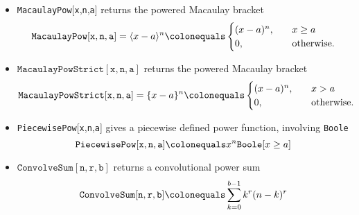 \documentclass[12pt, letterpaper]{amsart}
\newenvironment{myitemize}
{ \begin{itemize}
    \setlength{\itemsep}{4pt}
    \setlength{\parskip}{4pt}
    \setlength{\parsep}{4pt}     }
{ \end{itemize}                  }
\newcommand \power [2]{\langle #1 \rangle^{#2}}
\newcommand \curvepower [2]{\{ #1 \}^{#2}}
\newcommand \MacaulayPow [4][MacaulayPow]{\texttt{#1}[{\texttt{#2}},{\texttt{#3}},{\texttt{#4}}]}
\newcommand \MacaulayPowStrict [4][MacaulayPowStrict]{\texttt{#1}[{\texttt{#2}},{\texttt{#3}},{\texttt{#4}}]}
\newcommand \PiecewisePow [4][PiecewisePow]{\texttt{#1}[{\texttt{#2}},{\texttt{#3}},{\texttt{#4}}]}
\newcommand \ConvolveSum [4][ConvolveSum]{\texttt{{#1}} [{\texttt{#2}},{\texttt{#3}},{\texttt{#4}}]}
\theoremstyle{definition}
\theoremstyle{remark}
\numberwithin{equation}{section}
\begin{document}
\begin{myitemize}
\item \MacaulayPow{x}{n}{a} returns the powered Macaulay bracket
\begin{equation*}
\MacaulayPow{x}{n}{a}=\power{x-a}{n} \colonequals
\begin{cases}
(x-a)^n, &\quad x\geq a \\
0, &\quad \mathrm{otherwise}.
\end{cases}
\end{equation*}
\item $\MacaulayPowStrict{x}{n}{a}$ returns the powered Macaulay bracket
\begin{equation*}
\MacaulayPowStrict{x}{n}{a} = \curvepower{x-a}{n} \colonequals
\begin{cases}
(x-a)^n, &\quad x>a \\
0, &\quad \mathrm{otherwise}.
\end{cases}
\end{equation*}
\item \PiecewisePow{x}{n}{a} gives a piecewise defined power function, involving \texttt{Boole}
\begin{equation*}
\PiecewisePow{x}{n}{a} \colonequals x^n\texttt{Boole}[x\geq a]
\end{equation*}
\item $\ConvolveSum{n}{r}{b}$ returns a convolutional power sum
\begin{equation*}
\label{q_definition}
\ConvolveSum{n}{r}{b} \colonequals \sum_{k=0}^{b-1} k^r(n-k)^r
\end{equation*}
\end{myitemize}
\end{document}

